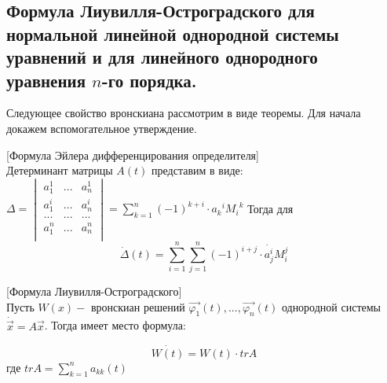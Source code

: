 \subsection{Формула Лиувилля-Остроградского для нормальной линейной однородной системы уравнений и для линейного однородного уравнения $n$-го порядка.}

Следующее свойство вронскиана рассмотрим в виде теоремы. Для начала докажем вспомогательное утверждение.

\begin{lemma}

[Формула Эйлера дифференцирования определителя]\\
Детерминант матрицы $A(t)$ представим в виде: 
$\Delta = 
\begin{vmatrix}
  a_1^1 & ... & a_n^1 \\
  a_1^i & ... & a_n^i \\
  ...   & ... & ...   \\
  a_1^n & ... & a_n^n \\
\end{vmatrix} = \sum\limits_{k = 1}^n{(-1)^{k + i} \cdot {a_k}^i {M_i}^k}
$
Тогда для 
\[\dot{\Delta}(t) = \sum\limits_{i = 1}^n{\sum\limits_{j = 1}^n{(-1)^{i + j} \cdot \dot{a_j^i}}M_i^j}\]

\end{lemma}

\begin{theorem}

[Формула Лиувилля-Остроградского]\\
Пусть $W(x) - $ вронскиан решений $\vec{\varphi_1}(t), ..., \vec{\varphi_n}(t)$ однородной системы $\dot{\vec{x}} = A\vec{x}$. Тогда имеет место формула:

\[\dot{W(t)} = W(t) \cdot trA\]
где $trA = \sum\limits_{k = 1}^n{a_{kk}(t)}$

\end{theorem}

